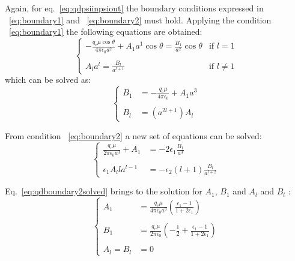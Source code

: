 \documentclass[11pt,oneside,a4paper]{article}
\begin{document}
Again, for eq.~\ref{eq:qdpsiinpsiout} the boundary conditions expressed in ~\ref{eq:boundary1} and ~\ref{eq:boundary2} must hold. Applying the condition ~\ref{eq:boundary1} the following equations are obtained:
\begin{equation}
 \label{eq:qdboundary1solved}
 \begin{cases}
  -\frac{q_\mathrm{c}\mu\cos\theta}{4\pi\epsilon_0 a^2} + A_1 a^1 \cos\theta = \frac{B_1}{a^2}\cos\theta   & \mbox{if } l=1 \\
  \\
  A_{l}a^{l} = \frac{B_{l}}{a^{l+1}} &\mbox{if } l\ne 1
 \end{cases}
\end{equation}
which can be solved as:
\begin{equation}
 \label{eq:qdboundary1solved2}
 \begin{cases}
  B_1 & = -\frac{q_\mathrm{c}\mu}{4\pi\epsilon_0} + A_1 a^3 \\
  \\
  B_{l} &= (a^{2l + 1} )A_{l}
 \end{cases}
\end{equation}

From condition ~\ref{eq:boundary2} a new set of equations can be solved:
\begin{equation}
 \label{eq:qdboundary2solved}
 \begin{cases}
  \frac{q_\mathrm{c}\mu}{2\pi \epsilon_0 a^3} + A_1  & = -2\epsilon_1 \frac{B_1}{a^3}  \\
  \\
  \epsilon_1 A_{l} l a^{l-1} &  = -\epsilon_2 (l+1) \frac{B_{l}}{a^{l+2}} 
 \end{cases}
\end{equation}
\newpage

Eq.~\ref{eq:qdboundary2solved} brings to the solution for $A_1$, $B_1$ and $A_{l}$ and $B_{l}$ : 
\begin{equation}
\label{eq:qdboundary2solved2}
\begin{cases}
 A_1 &= \frac{q_\mathrm{c}\mu}{4\pi\epsilon_0 a^3}\left (\frac{\epsilon_1 -1}{1+2\epsilon_1}\right )  \\
 \\
 B_1 &=\frac{q_\mathrm{c}\mu}{2\pi\epsilon_0}\left ( -\frac{1}{2} + \frac{\epsilon_1 - 1}{1+2\epsilon_1} \right )  \\
 \\
 A_{l} = B_{l} & = 0
\end{cases} 
\end{equation}
\end{document}

